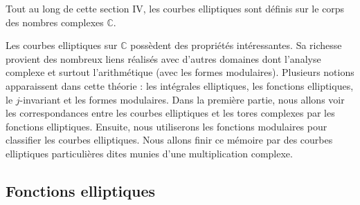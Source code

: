 \documentclass[a4paper]{article}
\begin{document}
\noindent Tout au long de cette section IV, les courbes elliptiques sont définis sur le corps des nombres complexes $\mathbb{C}$.

\noindent Les courbes elliptiques sur $\mathbb{C}$ possèdent des propriétés intéressantes. Sa richesse provient des nombreux liens réalisés avec d'autres domaines dont l'analyse complexe et surtout l'arithmétique (avec les formes modulaires).
Plusieurs notions apparaissent dans cette théorie : les intégrales elliptiques, les fonctions elliptiques, le $j$-invariant et les formes modulaires. Dans la première partie, nous allons voir les correspondances entre les courbes elliptiques et les tores complexes par les fonctions elliptiques. Ensuite, nous utiliserons les fonctions modulaires pour classifier les courbes elliptiques. Nous allons finir ce mémoire par des courbes elliptiques particulières dites munies d'une multiplication complexe.

\subsection{Fonctions elliptiques}
\end{document}
